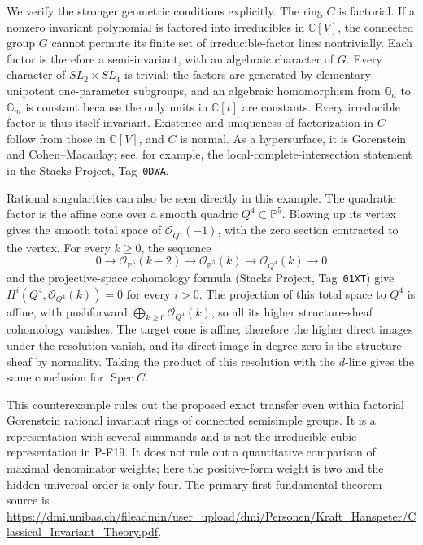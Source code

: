 \documentclass[11pt,a4paper]{article}
\begin{document}
We verify the stronger geometric conditions explicitly. The ring
$C$ is factorial. If a nonzero invariant polynomial is factored
into irreducibles in $\mathbb C[V]$, the connected group $G$
cannot permute its finite set of irreducible-factor lines
nontrivially. Each factor is therefore a semi-invariant, with
an algebraic character of $G$. Every character of $SL_2\times SL_4$
is trivial: the factors are generated by elementary unipotent
one-parameter subgroups, and an algebraic homomorphism from
$\mathbb G_a$ to $\mathbb G_m$ is constant because the only units
in $\mathbb C[t]$ are constants. Every irreducible factor is thus
itself invariant. Existence and uniqueness of factorization in
$C$ follow from those in $\mathbb C[V]$, and $C$ is normal.
As a hypersurface, it is Gorenstein and Cohen--Macaulay; see, for
example, the local-complete-intersection statement in the Stacks
Project, Tag~\texttt{0DWA}.

Rational singularities can also be seen directly in this example.
The quadratic factor is the affine cone over a smooth quadric
$Q^4\subset\mathbb P^5$. Blowing up its vertex gives the smooth
total space of $\mathcal O_{Q^4}(-1)$, with the zero section
contracted to the vertex. For every $k\ge0$, the sequence
\[
 0\longrightarrow\mathcal O_{\mathbb P^5}(k-2)
 \longrightarrow\mathcal O_{\mathbb P^5}(k)
 \longrightarrow\mathcal O_{Q^4}(k)\longrightarrow0
\]
and the projective-space cohomology formula (Stacks Project,
Tag~\texttt{01XT}) give
$H^i(Q^4,\mathcal O_{Q^4}(k))=0$ for every $i>0$.
The projection of this total space to $Q^4$ is affine, with
pushforward $\bigoplus_{k\ge0}\mathcal O_{Q^4}(k)$, so all its
higher structure-sheaf cohomology vanishes. The target cone is
affine; therefore the higher direct images under the resolution
vanish, and its direct image in degree zero is the structure
sheaf by normality. Taking the product of this resolution with
the $d$-line gives the same conclusion for $\operatorname{Spec}C$.

This counterexample rules out the proposed exact transfer even
within factorial Gorenstein rational invariant rings of connected
semisimple groups. It is a representation with several summands
and is not the irreducible cubic representation in P-F19. It does
not rule out a quantitative comparison of maximal denominator
weights; here the positive-form weight is two and the hidden
universal order is only four. The primary first-fundamental-theorem
source is
\url{https://dmi.unibas.ch/fileadmin/user_upload/dmi/Personen/Kraft_Hanspeter/Classical_Invariant_Theory.pdf}.
\end{document}
